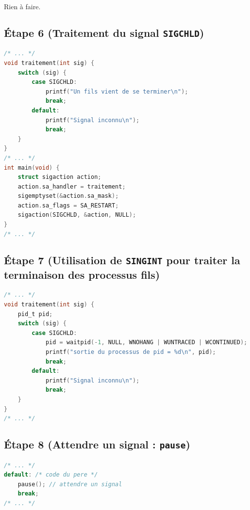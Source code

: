\documentclass{article}
\begin{document}
Rien à faire.

\subsection*{Étape 6 (Traitement du signal \texttt{SIGCHLD})}

\begin{lstlisting}[language=C, caption=ajout de la question 6]
/* ... */
void traitement(int sig) {
    switch (sig) {
        case SIGCHLD:
            printf("Un fils vient de se terminer\n");
            break;
        default:
            printf("Signal inconnu\n");
            break;
    }
}
/* ... */
int main(void) {
    struct sigaction action;
    action.sa_handler = traitement;
    sigemptyset(&action.sa_mask);
    action.sa_flags = SA_RESTART;
    sigaction(SIGCHLD, &action, NULL);
}
/* ... */
\end{lstlisting}

\subsection*{Étape 7 (Utilisation de \texttt{SINGINT} pour traiter la terminaison des processus fils)}

\begin{lstlisting}[language=C, caption=ajout de la question 7]
/* ... */
void traitement(int sig) {
    pid_t pid;
    switch (sig) {
        case SIGCHLD:
            pid = waitpid(-1, NULL, WNOHANG | WUNTRACED | WCONTINUED);
            printf("sortie du processus de pid = %d\n", pid);
            break;
        default:
            printf("Signal inconnu\n");
            break;
    }
}
/* ... */
\end{lstlisting}

\subsection*{Étape 8 (Attendre un signal : \texttt{pause})}

\begin{lstlisting}[language=C, caption=ajout de la question 8]
/* ... */
default: /* code du pere */
    pause(); // attendre un signal
    break;
/* ... */
\end{lstlisting}
\end{document}
